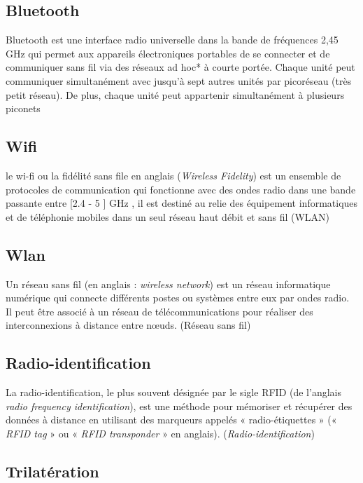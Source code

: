 \documentclass[12pt,a4paper]{report}
\begin{document}
\subsection{Bluetooth}

Bluetooth est une interface radio universelle dans la bande de fréquences 2,45 GHz qui permet aux appareils électroniques portables de se connecter et de communiquer sans fil via des réseaux ad hoc* à courte portée. Chaque unité peut communiquer simultanément avec jusqu'à sept autres unités par picoréseau (très petit réseau). De plus, chaque unité peut appartenir simultanément à plusieurs piconets \cite{bluetooth}

\subsection{Wifi}

le wi-fi ou la fidélité sans file en anglais (\textit{Wireless Fidelity}) est un ensemble de protocoles de communication qui fonctionne avec des ondes radio dans une bande passante entre [2.4 - 5 ] GHz , il est destiné au relie des équipement informatiques et de téléphonie mobiles dans un seul réseau haut débit et sans fil (WLAN)

\subsection{Wlan}
Un réseau sans fil (en anglais : \textit{wireless network}) est un réseau informatique numérique qui connecte différents postes ou systèmes entre eux par ondes radio. Il peut être associé à un réseau de télécommunications pour réaliser des interconnexions à distance entre nœuds. (Réseau sans fil) 


\subsection{Radio-identification}
	La radio-identification, le plus souvent désignée par le sigle RFID (de l’anglais \textit{radio frequency identification}), est une méthode pour mémoriser et récupérer des données à distance en utilisant des marqueurs appelés « radio-étiquettes » («\textit{ RFID tag} » ou « \textit{RFID transponder} » en anglais). (\textit{Radio-identification})\cite{rfid}

\subsection{Trilatération}
\end{document}
